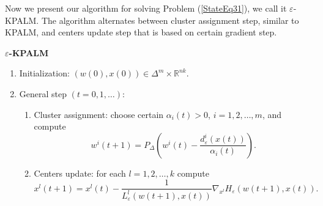 \documentclass[11pt]{article}
\numberwithin{equation}{section}
\begin{document}

Now we present our algorithm for solving Problem (\ref{StateEq31}), we call it $\varepsilon$-KPALM.  The algorithm alternates between cluster assignment step, similar to  KPALM, and centers update step that is based on certain gradient step.

\begin{framed}
\noindent \textbf{$\varepsilon$-KPALM}
\begin{enumerate}[(1)]
	\item Initialization: $(w(0),x(0)) \in \Delta^m \times \mathbb{R}^{nk} .$
	\item General step $\left( t=0,1, \ldots \right)$:
	\begin{enumerate}[(2.1)]
		\item Cluster assignment: choose certain $\alpha_i(t) > 0$, $i=1,2, \ldots, m$, and compute
		\begin{equation}
			w^i(t+1) = P_{\Delta} \left(w^i(t) - \frac{d_{\varepsilon}^i(x(t))}{\alpha_i(t)}\right) . \label{StateEq32}
		\end{equation}
		\item Centers update: for each $l=1, 2, \ldots ,k$ compute
		\begin{equation}
			x^l(t+1) = x^l(t) - \frac{1}{L^l_{\varepsilon}(w(t+1), x(t))}\nabla_{x^l} H_{\varepsilon}(w(t+1), x(t)) . \label{StateEq33}
		\end{equation}
	\end{enumerate}
\end{enumerate}
\end{framed}
\end{document}
